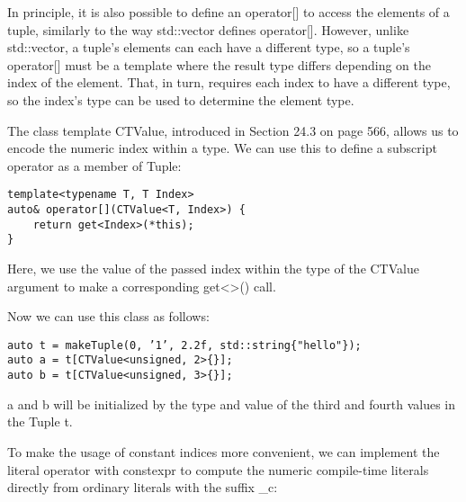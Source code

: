 In principle, it is also possible to define an operator[] to access the elements of a tuple, similarly to the way std::vector defines operator[]. However, unlike std::vector, a tuple’s elements can each have a different type, so a tuple’s operator[] must be a template where the result type differs depending on the index of the element. That, in turn, requires each index to have a different type, so the index’s type can be used to determine the element type.

The class template CTValue, introduced in Section 24.3 on page 566, allows us to encode the numeric index within a type. We can use this to define a subscript operator as a member of Tuple:

\begin{lstlisting}[style=styleCXX]
template<typename T, T Index>
auto& operator[](CTValue<T, Index>) {
	return get<Index>(*this);
}
\end{lstlisting}

Here, we use the value of the passed index within the type of the CTValue argument to make a corresponding get<>() call.

Now we can use this class as follows:

\begin{lstlisting}[style=styleCXX]
auto t = makeTuple(0, ’1’, 2.2f, std::string{"hello"});
auto a = t[CTValue<unsigned, 2>{}];
auto b = t[CTValue<unsigned, 3>{}];
\end{lstlisting}

a and b will be initialized by the type and value of the third and fourth values in the Tuple t.

To make the usage of constant indices more convenient, we can implement the literal operator with constexpr to compute the numeric compile-time literals directly from ordinary literals with the suffix \_c:

